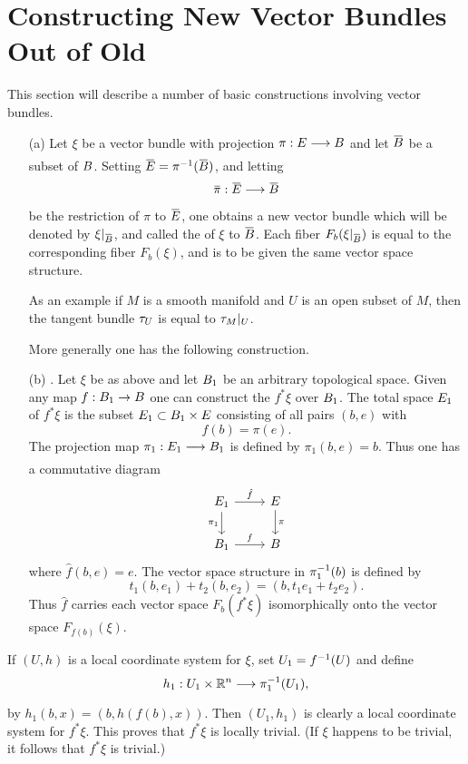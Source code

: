 \documentclass[../main]{subfiles}
\begin{document}
\chapter{Constructing New Vector Bundles Out of Old}\label{ch:3}

This section will describe a number of basic constructions involving vector bundles.
\begin{enumerate}
\item[(a)] 
\newline
Let $\xi$ be a vector bundle with projection $\pi : \total\varrightarrow{} \B$ and let $\xoverline{\B}$ be a subset of $B$. Setting $\xoverline{\total}=\pi\inv(\xoverline{\B})$, and letting
\[
\xoverline{\pi} : \xoverline{\total}\longrightarrow \xoverline{\B}
\]
be the restriction of $\pi$ to $\xoverline{\total}$, one obtains a new vector bundle which will be denoted by $\xi|_{\xoverline{\B}}$, and called the  of $\xi$ to $\xoverline{\B}$. Each fiber $F_b(\xi|_{\xoverline{\B}})$ is equal to the corresponding fiber $F_b(\xi)$, and is to be given the same vector space structure.

As an example if $M$ is a smooth manifold and $U$ is an open subset of $M$, then the tangent bundle $\tau_{U}$ is equal to $\tau_{M}|_{U}$.

More generally one has the following construction.


\item[(b)] .
\newline
Let $\xi$ be as above and let $B_1$ be an arbitrary topological space. Given any map $f : B_1\to B$ one can construct the  $f^*\xi$ over $B_1$. The total space $E_1$ of $f^*\xi$ is the subset $E_1 \subset B_1 \times E$ consisting of all pairs $(b, e)$ with 
\[
f(b)=\pi(e).
\]
The projection map $\pi_1 : \total_1\varrightarrow{} \B_1$ is defined by $\pi_1(b,e)=b$. Thus one has a commutative diagram
\[
\begin{tikzcd}
	\total_1 \arrow[r, "\hat{f}"] \arrow[d, "\pi_1", swap] &\total \arrow["\pi", d] \\
	\B_1 \arrow[r, "f"]   & \B          
\end{tikzcd}
\]
where $\hat{f}(b, e) = e$. The vector space structure in $\pi_1^{-1}(b)$ is defined by
\[
t_1 (b, e_1) + t_2 (b, e_2) = (b, t_1 e_1 + t_2 e_2).
\]
Thus $\hat{f}$ carries each vector space $F_b(f^*\xi)$ isomorphically onto the vector space $F_{f(b)}(\xi)$.\end{enumerate}
If $(U,h)$ is a local coordinate system for $\xi$, set $U_1 = f^{-1}(U)$ and define
\[
h_{1} : U_{1} \times \bR^{n} \varrightarrow{} \pi_{1}\inv(U_{1}),
\]
by $h_{1}(b, x)=(b, h(f(b), x))$. Then $(U_1, h_1)$ is clearly a local coordinate system for $f^*\xi$. This proves that $f^*\xi$ is locally trivial. (If $\xi$ happens to be trivial, it follows that $f^*\xi$ is trivial.)
\end{document}
